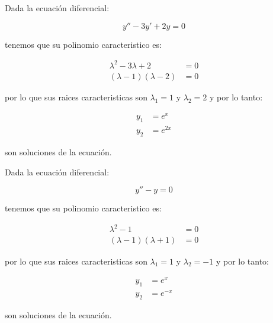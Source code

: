 		\begin{ejemplo}
			Dada la ecuación diferencial:

			\begin{equation*}
				y'' - 3 y' + 2 y = 0
			\end{equation*}

			tenemos que su polinomio caracteristico es:

			\begin{align*}
				\lambda^2 - 3\lambda + 2 &= 0 \\
				(\lambda - 1)(\lambda - 2) &= 0
			\end{align*}

			por lo que sus raices caracteristicas son $\lambda_1 = 1$ y $\lambda_2 = 2$ y por lo tanto:

			\begin{align*}
				y_1 &= e^x \\
				y_2 &= e^{2x}
			\end{align*}

			son soluciones de la ecuación.
		\end{ejemplo}

		\begin{ejemplo}
			Dada la ecuación diferencial:

			\begin{equation*}
				y'' - y = 0
			\end{equation*}

			tenemos que su polinomio caracteristico es:

			\begin{align*}
				\lambda^2 - 1 &= 0 \\
				(\lambda - 1)(\lambda + 1) &= 0
			\end{align*}

			por lo que sus raices caracteristicas son $\lambda_1 = 1$ y $\lambda_2 = -1$ y por lo tanto:

			\begin{align*}
				y_1 &= e^x \\
				y_2 &= e^{-x}
			\end{align*}

			son soluciones de la ecuación.
		\end{ejemplo}

